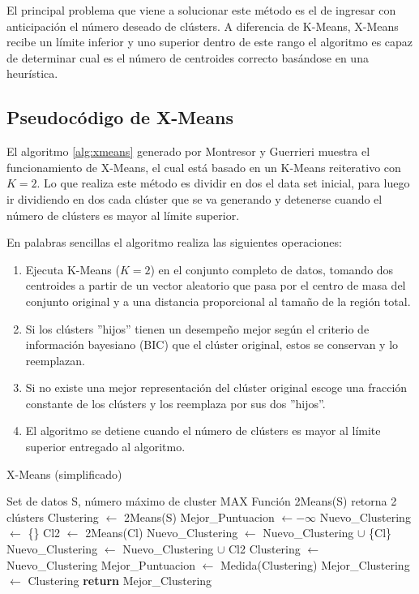 El principal problema que viene a solucionar este método es el de ingresar con anticipación el número deseado de clústers. A diferencia de K-Means, X-Means recibe un límite inferior y uno superior dentro de este rango el algoritmo es capaz de determinar cual es el número de centroides correcto basándose en una heurística.

\subsection{Pseudocódigo de X-Means}

El algoritmo \ref{alg:xmeans} generado por Montresor y Guerrieri \cite{montresordecentralized} muestra el funcionamiento de X-Means, el cual está basado en un K-Means reiterativo con $K=2$. Lo que realiza este método es dividir en dos el data set inicial, para luego ir dividiendo en dos cada clúster que se va generando y detenerse cuando el número de clústers es mayor al límite superior.

En palabras sencillas el algoritmo realiza las siguientes operaciones:
\begin{enumerate}
    \item Ejecuta K-Means ($K=2$) en el conjunto completo de datos, tomando dos centroides a partir de un vector aleatorio que pasa por el centro de masa del conjunto original y a una distancia proporcional al tamaño de la región total.
    \item Si los clústers ''hijos'' tienen un desempeño mejor según el criterio de información bayesiano (BIC) que el clúster original, estos se conservan y lo reemplazan. 
    \item Si no existe una mejor representación del clúster original escoge una fracción constante de los clústers y los reemplaza por sus dos ''hijos''.
    \item El algoritmo se detiene cuando el número de clústers es mayor al límite superior entregado al algoritmo.
\end{enumerate}

\begin{algorithm}
\caption{X-Means (simplificado) \cite{montresordecentralized}}\label{alg:xmeans}
\begin{algorithmic}[1]
\Require Set de datos S, número máximo de cluster MAX
\Require Función 2Means(S) retorna 2 clústers
\State Clustering $\gets$ 2Means(S)
\State Mejor\_Puntuacion $\gets -\infty$ 
\State Nuevo\_Clustering $\gets$ \{\}
\State Cl2 $\gets$ 2Means(Cl)
\State Nuevo\_Clustering $\gets$ Nuevo\_Clustering $ \cup $ \{Cl\}
\Else
\State Nuevo\_Clustering $\gets$ Nuevo\_Clustering $ \cup $ Cl2
\EndIf
\EndFor
\State Clustering $\gets$ Nuevo\_Clustering
\State Mejor\_Puntuacion $\gets$ Medida(Clustering)
\State Mejor\_Clustering $\gets$ Clustering
\EndIf
\EndWhile\label{euclidendwhile}
\State \textbf{return} Mejor\_Clustering %
\end{algorithmic}
\end{algorithm}


